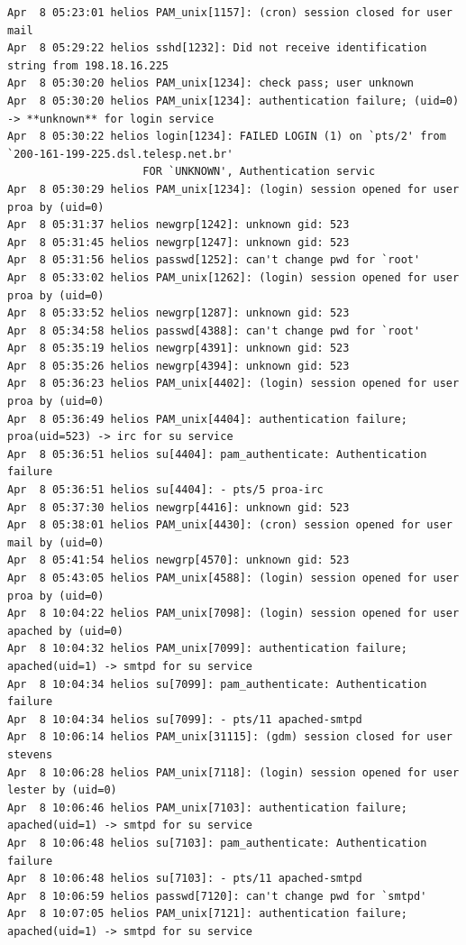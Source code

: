 \begin{lstlisting}[style=terminal]
Apr  8 05:23:01 helios PAM_unix[1157]: (cron) session closed for user mail
Apr  8 05:29:22 helios sshd[1232]: Did not receive identification string from 198.18.16.225
Apr  8 05:30:20 helios PAM_unix[1234]: check pass; user unknown
Apr  8 05:30:20 helios PAM_unix[1234]: authentication failure; (uid=0) -> **unknown** for login service
Apr  8 05:30:22 helios login[1234]: FAILED LOGIN (1) on `pts/2' from `200-161-199-225.dsl.telesp.net.br' 
                     FOR `UNKNOWN', Authentication servic
Apr  8 05:30:29 helios PAM_unix[1234]: (login) session opened for user proa by (uid=0)
Apr  8 05:31:37 helios newgrp[1242]: unknown gid: 523
Apr  8 05:31:45 helios newgrp[1247]: unknown gid: 523
Apr  8 05:31:56 helios passwd[1252]: can't change pwd for `root'
Apr  8 05:33:02 helios PAM_unix[1262]: (login) session opened for user proa by (uid=0)
Apr  8 05:33:52 helios newgrp[1287]: unknown gid: 523
Apr  8 05:34:58 helios passwd[4388]: can't change pwd for `root'
Apr  8 05:35:19 helios newgrp[4391]: unknown gid: 523
Apr  8 05:35:26 helios newgrp[4394]: unknown gid: 523
Apr  8 05:36:23 helios PAM_unix[4402]: (login) session opened for user proa by (uid=0)
Apr  8 05:36:49 helios PAM_unix[4404]: authentication failure; proa(uid=523) -> irc for su service
Apr  8 05:36:51 helios su[4404]: pam_authenticate: Authentication failure
Apr  8 05:36:51 helios su[4404]: - pts/5 proa-irc
Apr  8 05:37:30 helios newgrp[4416]: unknown gid: 523
Apr  8 05:38:01 helios PAM_unix[4430]: (cron) session opened for user mail by (uid=0)
Apr  8 05:41:54 helios newgrp[4570]: unknown gid: 523
Apr  8 05:43:05 helios PAM_unix[4588]: (login) session opened for user proa by (uid=0)
Apr  8 10:04:22 helios PAM_unix[7098]: (login) session opened for user apached by (uid=0)
Apr  8 10:04:32 helios PAM_unix[7099]: authentication failure; apached(uid=1) -> smtpd for su service
Apr  8 10:04:34 helios su[7099]: pam_authenticate: Authentication failure
Apr  8 10:04:34 helios su[7099]: - pts/11 apached-smtpd
Apr  8 10:06:14 helios PAM_unix[31115]: (gdm) session closed for user stevens
Apr  8 10:06:28 helios PAM_unix[7118]: (login) session opened for user lester by (uid=0)
Apr  8 10:06:46 helios PAM_unix[7103]: authentication failure; apached(uid=1) -> smtpd for su service
Apr  8 10:06:48 helios su[7103]: pam_authenticate: Authentication failure
Apr  8 10:06:48 helios su[7103]: - pts/11 apached-smtpd
Apr  8 10:06:59 helios passwd[7120]: can't change pwd for `smtpd'
Apr  8 10:07:05 helios PAM_unix[7121]: authentication failure; apached(uid=1) -> smtpd for su service

\end{lstlisting}
